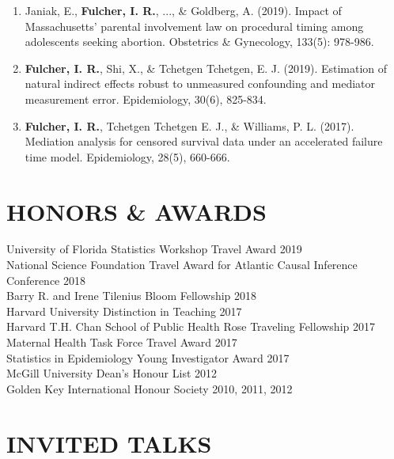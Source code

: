 \documentclass[12pt]{article}
\begin{document}
\begin{enumerate}
	\item Janiak, E., \textbf{Fulcher, I. R.}, ..., \& Goldberg, A. (2019). Impact of Massachusetts' parental involvement law on procedural timing among adolescents seeking abortion. Obstetrics \& Gynecology, 133(5): 978-986.

	\item \textbf{Fulcher, I. R.}, Shi, X., \& Tchetgen Tchetgen, E. J. (2019). Estimation of natural indirect effects robust to unmeasured confounding and mediator measurement error. Epidemiology, 30(6), 825-834.
	
	\item \textbf{Fulcher, I. R.}, Tchetgen Tchetgen E. J., \& Williams, P. L. (2017). Mediation analysis for censored survival data under an accelerated failure time model.  Epidemiology, 28(5), 660-666. 
	
\end{enumerate}



\section*{\textbf{{\large H}{ONORS} {\large \&} {\large A}{WARDS}}}
University of Florida Statistics Workshop Travel Award \hfill \hfill 2019 \\
National Science Foundation Travel Award for Atlantic Causal Inference Conference \hfill \hfill	2018 \\
Barry R. and Irene Tilenius Bloom Fellowship \hfill \hfill	2018 \\
Harvard University Distinction in Teaching \hfill \hfill 2017 \\
Harvard T.H. Chan School of Public Health Rose Traveling Fellowship \hfill \hfill	2017 \\
Maternal Health Task Force Travel Award \hfill \hfill	2017 \\
Statistics in Epidemiology Young Investigator Award  \hfill \hfill	2017 \\
McGill University Dean's Honour List  \hfill \hfill	2012 \\
Golden Key International Honour Society  \hfill \hfill2010, 2011, 2012 


\section*{\textbf{{\large I}{NVITED} {\large T}{ALKS}}}   
\end{document}
